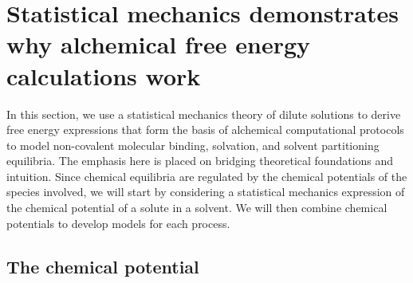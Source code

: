\documentclass[9pt,bestpractices]{livecoms}
\begin{document}
\section{Statistical mechanics demonstrates why alchemical free energy calculations work}
\label{sec:theory}


In this section, we use a statistical mechanics theory of dilute solutions to derive free energy expressions that form the basis of alchemical computational protocols to model non-covalent molecular binding, solvation, and solvent partitioning equilibria. The emphasis here is placed on bridging theoretical foundations and intuition. Since chemical equilibria are regulated by the chemical potentials of the species involved, we will start by considering a statistical mechanics expression of the chemical potential of a solute in a solvent. We will then combine chemical potentials to develop models for each process.

\subsection{The chemical potential}
\end{document}
